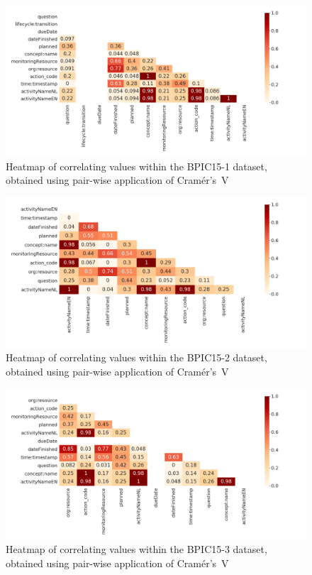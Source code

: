 \begin{figure}[ht!]
\centering
\includegraphics[width=\textwidth]{gfx/bpic2015_1/correlation-heatmap.png}
\caption[Cramér's V heatmap of BPIC15-1]{Heatmap of correlating values within the BPIC15-1 dataset, obtained using pair-wise application of Cramér's~V}
\label{fig:BPIC15-1-correlation-heatmap}
\end{figure}

\begin{figure}[ht!]
\centering
\includegraphics[width=\textwidth]{gfx/bpic2015_2/correlation-heatmap.png}
\caption[Cramér's V heatmap of BPIC15-2]{Heatmap of correlating values within the BPIC15-2 dataset, obtained using pair-wise application of Cramér's~V}
\label{fig:BPIC15-2-correlation-heatmap}
\end{figure}

\begin{figure}[ht!]
\centering
\includegraphics[width=\textwidth]{gfx/bpic2015_3/correlation-heatmap.png}
\caption[Cramér's V heatmap of BPIC15-3]{Heatmap of correlating values within the BPIC15-3 dataset, obtained using pair-wise application of Cramér's~V}
\label{fig:BPIC15-3-correlation-heatmap}
\end{figure}

